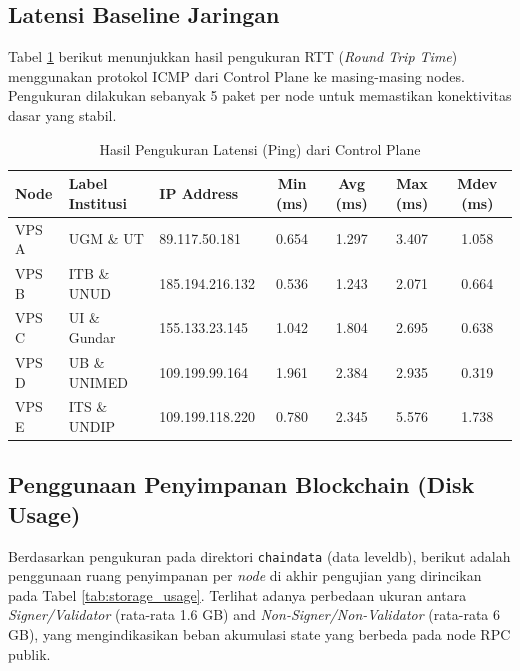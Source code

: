 \clearpage
\subsection{Latensi Baseline Jaringan}
Tabel \ref{tab:latency_ping} berikut menunjukkan hasil pengukuran RTT (\textit{Round Trip Time}) menggunakan protokol ICMP dari Control Plane ke masing-masing nodes. Pengukuran dilakukan sebanyak 5 paket per node untuk memastikan konektivitas dasar yang stabil.

\begin{table}[h]
\centering
\caption{Hasil Pengukuran Latensi (Ping) dari Control Plane}
\label{tab:latency_ping}
\begin{tabular}{|l|l|l|c|c|c|c|}
\hline
\textbf{Node} & \textbf{Label Institusi} & \textbf{IP Address} & \textbf{Min (ms)} & \textbf{Avg (ms)} & \textbf{Max (ms)} & \textbf{Mdev (ms)} \\ \hline
VPS A & UGM \& UT & 89.117.50.181 & 0.654 & 1.297 & 3.407 & 1.058 \\ \hline
VPS B & ITB \& UNUD & 185.194.216.132 & 0.536 & 1.243 & 2.071 & 0.664 \\ \hline
VPS C & UI \& Gundar & 155.133.23.145 & 1.042 & 1.804 & 2.695 & 0.638 \\ \hline
VPS D & UB \& UNIMED & 109.199.99.164 & 1.961 & 2.384 & 2.935 & 0.319 \\ \hline
VPS E & ITS \& UNDIP & 109.199.118.220 & 0.780 & 2.345 & 5.576 & 1.738 \\ \hline
\end{tabular}
\end{table}

\subsection{Penggunaan Penyimpanan Blockchain (Disk Usage)}
Berdasarkan pengukuran pada direktori \texttt{chaindata} (data leveldb), berikut adalah penggunaan ruang penyimpanan per \textit{node} di akhir pengujian yang dirincikan pada Tabel \ref{tab:storage_usage}. Terlihat adanya perbedaan ukuran antara \textit{Signer/Validator} (rata-rata 1.6 GB) and \textit{Non-Signer/Non-Validator} (rata-rata 6 GB), yang mengindikasikan beban akumulasi state yang berbeda pada node RPC publik.

